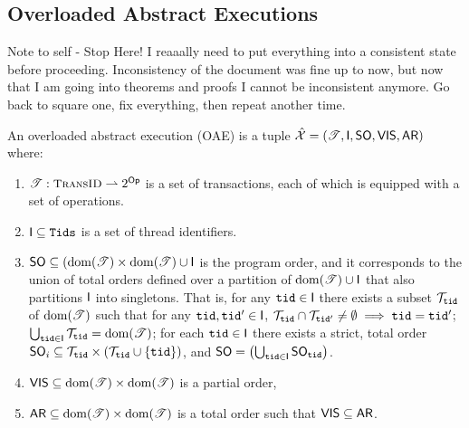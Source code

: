 \subsection{Overloaded Abstract Executions}

\ac{Note to self - Stop Here! I reaaally need to put everything into a consistent state before proceeding. 
Inconsistency of the document was fine up to now, but now that I am going into theorems 
and proofs I cannot be inconsistent anymore. Go back to square one, fix everything, then repeat 
another time.}


\begin{definition}
An overloaded abstract execution (OAE) is a tuple $\hat{\mathcal{X}} = (\mathscr{T}, \mathsf{I}, {\sf{SO}}, {\mathsf{VIS}}, {\sf{AR}})$ where: 
\begin{enumerate}
\item $\mathscr{T} : \TransID \rightharpoonup 2^{\Op}$ is a set of transactions, each of which is equipped with a set of 
operations.
\item $\mathsf{I} \subseteq \mathtt{Tids}$ is a set of thread identifiers.
\item ${\sf{SO}} \subseteq (\operatorname{dom}(\mathscr{T}) \times \operatorname{dom}(\mathscr{T}) \cup \mathsf{I}$ is the program order, and it corresponds 
to the union of total orders defined over a partition of $\operatorname{dom}(\mathscr{T}) \cup \mathsf{I}$ that also partitions 
$\mathsf{I}$ into singletons. That is, for any $\mathtt{tid} \in \mathsf{I}$ there exists a subset $\mathcal{T}_{\mathtt{tid}}$ of $\operatorname{dom}(\mathscr{T})$ 
such that for any $\mathtt{tid},\mathtt{tid}' \in \mathsf{I}$, $\mathcal{T}_{\mathtt{tid}} \cap \mathcal{T}_{\mathtt{tid}'} \neq \emptyset \implies \mathtt{tid} = \mathtt{tid}'$; 
$\bigcup_{\mathtt{tid} \in \mathsf{I}} \mathcal{T}_{\mathtt{tid}} = \operatorname{dom}(\mathscr{T})$; 
for each $\mathtt{tid} \in \mathsf{I}$ there exists a strict, total order ${\sf{SO}}_{i} \subseteq \mathcal{T}_{\mathtt{tid}} \times (\mathcal{T}_{\mathtt{tid}} \cup \{\mathtt{tid}\})$, 
and ${\sf{SO}} = \left( \bigcup_{\mathtt{tid} \in \mathsf{I}} {\sf{SO}}_{\mathtt{tid}} \right)$.
\item ${\mathsf{VIS}} \subseteq \operatorname{dom}(\mathscr{T}) \times \operatorname{dom}(\mathscr{T})$ is a partial order, 
\item ${\sf{AR}} \subseteq \operatorname{dom}(\mathscr{T}) \times \operatorname{dom}(\mathscr{T})$ is a total order such that ${\mathsf{VIS}} \subseteq {\sf{AR}}$.
\end{enumerate}
\end{definition}

